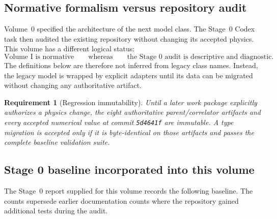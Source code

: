\documentclass[11pt]{article}
\newtheorem{requirement}[definition]{Requirement}
\begin{document}
\subsection{Normative formalism versus repository audit}

Volume~0 specified the architecture of the next model class.  The Stage~0
Codex task then audited the existing repository without changing its accepted
physics.  This volume has a different logical status:
\begin{equation}
\boxed{\text{Volume I is normative}}
\qquad\text{whereas}\qquad
\boxed{\text{the Stage 0 audit is descriptive and diagnostic}.}
\label{eq:normative-descriptive}
\end{equation}
The definitions below are therefore not inferred from legacy class names.
Instead, the legacy model is wrapped by explicit adapters until its data can
be migrated without changing any authoritative artifact.

\begin{requirement}[Regression immutability]
\label{req:regression-immutability}
Until a later work package explicitly authorizes a physics change, the eight
authoritative parent/correlator artifacts and every accepted numerical value
at commit \texttt{5d4641f} are immutable.  A type migration is accepted only
if it is byte-identical on those artifacts and passes the complete baseline
validation suite.
\end{requirement}

\subsection{Stage 0 baseline incorporated into this volume}

The Stage~0 report supplied for this volume records the following baseline.
The counts supersede earlier documentation counts where the repository gained
additional tests during the audit.
\end{document}
